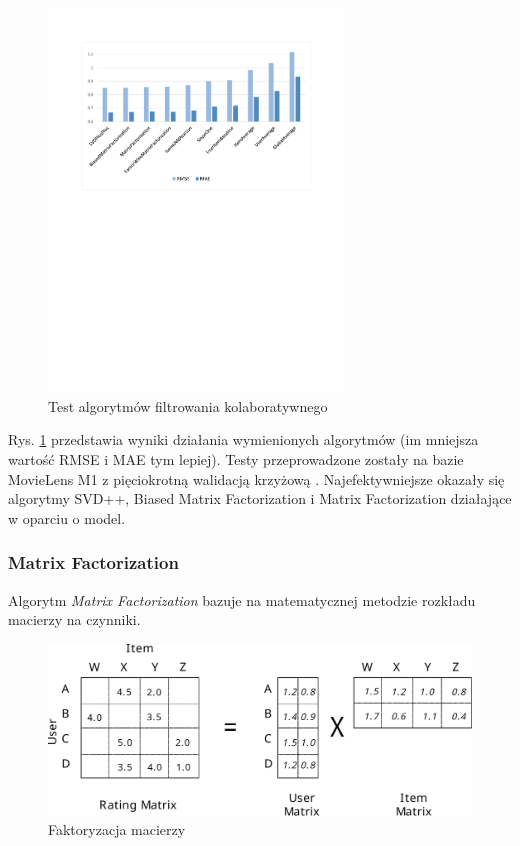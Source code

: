 \documentclass[twoside]{iisthesis}
\begin{document}
	 \begin{figure}[!ht] 
	 	\centering
	 	\includegraphics[width=0.7\textwidth]{cfcomparision}
	 	\caption{Test algorytmów filtrowania kolaboratywnego \protect\cite{mymedialitedatasets}}
	 	\label{fig:cfcomparision}
	 \end{figure}
	 
	 Rys. \ref{fig:cfcomparision} przedstawia wyniki działania wymienionych algorytmów (im mniejsza wartość RMSE i MAE tym lepiej). Testy przeprowadzone zostały na bazie MovieLens M1 z pięciokrotną walidacją krzyżową \cite{harper2016movielens}. Najefektywniejsze okazały się algorytmy SVD++, Biased Matrix Factorization i Matrix Factorization działające w oparciu o model.
	 
	 \subsubsection{Matrix Factorization}	
	 
	 Algorytm \textit{Matrix Factorization} bazuje na matematycznej metodzie rozkładu macierzy na czynniki.
	 
	 
	 \begin{figure}[!ht] 
	 	\centering
	 	\includegraphics[width=1\textwidth]{factorization}
	 	\caption{Faktoryzacja macierzy \protect\cite{id:ComputingRecommendationsExtremeScaleApacheFlink}}
	 	\label{fig:factorization}
	 \end{figure}
	 
\end{document}
